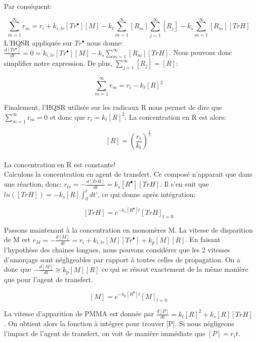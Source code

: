 \documentclass[a4paper,oneside,12pt]{article}
\begin{document}
Par conséquent:

\begin{equation}
\sum\limits_{m=1}^\infty r_{m}=r_i+ k_{i,tr}[Tr^{\bullet}][M] -k_{t}\sum\limits_{m=1}^\infty [R_m] \sum\limits_{j=1}^\infty[R_j]-k_{s}\sum\limits_{m=1}^\infty[R_{m}][TrH]
\end{equation}
L'HQSR appliquée sur $Tr^{\bullet}$ nous donne: $\frac{d[Tr^{\bullet}]}{dt}=0=k_{i,tr}[Tr^{\bullet}][M]-k_{s}\sum\limits_{m=1}^\infty[R_{m}][TrH]$. Nous pouvons donc simplifier notre expression. De plus, $\sum\limits_{j=1}^\infty[R_j] = [R]$:

\begin{equation}
\sum\limits_{m=1}^\infty r_{m}=r_i-k_{t}[R]^2
\end{equation}

Finalement, l'HQSR utilisée sur les radicaux R nous permet de dire que $\sum\limits_{m=1}^\infty r_{m}=0$ et donc que $r_i=k_{t}[R]^2$. La concentration en R est alors:

$$[R]=(\frac{r_i}{k_t})^{\frac{1}{2}}$$\\

La concentration en R est constante!\\

 Calculons la concentration en agent de transfert. Ce composé n'apparait que dans une réaction, donc: $r_{tr}=-\frac{d[TrH]}{dt}=k_s[R^{\bullet}][TrH]$. Il s'en suit que $ln([TrH])=-k_s[R]\int_{0}^t dt'$, ce qui donne après intégration:

$$[TrH]=e^{-k_s[R^{\bullet}]t}[TrH]_{t=0}$$

Passons maintenant à la concentration en monomères M. La vitesse de disparition de M est $r_M = -\frac{d[M]}{dt}=r_{i}+k_{i,tr}[M][Tr^{\bullet}]+k_{p}[M][R]$. En faisant l'hypothèse des chaines longues, nous pouvons considérer que les 2 vitesses d'amorçage sont négligeables par rapport à toutes celles de propagation. On a donc que $-\frac{d[M]}{dt}\cong k_{p}[M][R]$ ce qui se résout exactement de la même manière que pour l'agent de transfert.

$$[M]=e^{-k_p[R^{\bullet}]t}[M]_{t=0}$$

La vitesse d'apparition de PMMA est donnée par $\frac{d[P]}{dt}=k_{t}[R]^2+k_{s}[R][TrH]$. On obtient alors la fonction à intégrer pour trouver [P]. Si nous négligeons l'impact de l'agent de transfert, on voit de manière immédiate que $[P]=r_i t$. %
\end{document}
